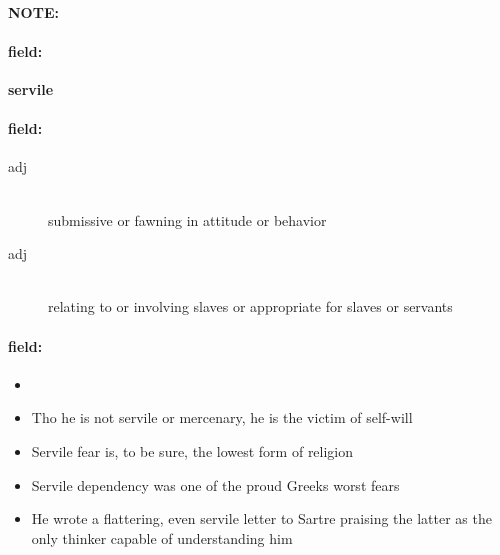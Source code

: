 \documentclass[12pt]{article}
\newenvironment{note}{\paragraph{NOTE:}}{}
\newenvironment{field}{\paragraph{field:}}{}
\begin{document}
\begin{note}
\begin{field}
\textbf{\large servile}
\end{field}


\begin{field}
\begin{description}
\item[adj] \hfill \\ 
submissive or fawning in attitude or behavior

\item[adj] \hfill \\ 
relating to or involving slaves or appropriate for slaves or servants

\end{description}
\end{field}

\begin{field}
\begin{itemize}
\item 
\item Tho he is not servile or mercenary, he is the victim of self-will
\item Servile fear is, to be sure, the lowest form of religion
\item Servile dependency was one of the proud Greeks worst fears
\item He wrote a flattering, even servile letter to Sartre praising the latter as the only thinker capable of understanding him
\end{itemize}
\end{field}
\end{note}
\end{document}
